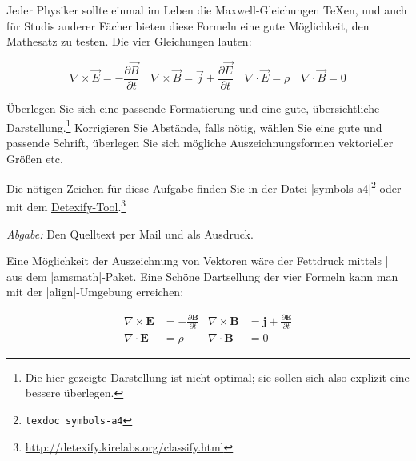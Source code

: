 \documentclass{scrartcl}
\newcommand{\abgabe}[1]{\par\noindent\textit{Abgabe:} #1}
\begin{document}
\begin{question}[subtitle=Maxwell-Gleichungen]{6}
	Jeder Physiker sollte einmal im Leben die Maxwell-Gleichungen \TeX{}en, und auch für Studis anderer Fächer bieten diese Formeln eine gute Möglichkeit, den Mathesatz zu testen. Die vier Gleichungen lauten:

	\[\textstyle \nabla \times \vec E = -\frac{\partial \vec B}{\partial t}\quad \nabla \times \vec B = \vec j + \frac{\partial \vec E}{\partial t}\quad \nabla \cdot \vec E = \rho\quad 
	\nabla \cdot \vec B = 0\]
	
	\noindent Überlegen Sie sich eine passende Formatierung und eine gute, übersichtliche Darstellung.\footnote{Die hier gezeigte Darstellung ist nicht optimal; sie sollen sich also explizit eine bessere überlegen.} Korrigieren Sie Abstände, falls nötig, wählen Sie eine gute und passende Schrift, überlegen Sie sich mögliche Auszeichnungsformen vektorieller Größen etc.
	
	Die nötigen Zeichen für diese Aufgabe finden Sie in der Datei |symbols-a4|\footnote{\texttt{texdoc symbols-a4}} oder mit dem \href{http://detexify.kirelabs.org/classify.html}{Detexify-Tool}.\footnote{\url{http://detexify.kirelabs.org/classify.html}}
	
	\abgabe{Den Quelltext per Mail und als Ausdruck.}
\end{question}

\newsavebox{\SolutionCodeA}
\begin{lrbox}{\SolutionCodeA}
\begin{minipage}{\textwidth}
Eine Möglichkeit der Auszeichnung von Vektoren wäre der Fettdruck mittels |\pmb| aus dem |amsmath|-Paket. Eine Schöne Dartsellung der vier Formeln kann man mit der |align|-Umgebung erreichen:
\begin{LTXexample}
\begin{align*}
  \nabla \times \pmb E &= -\frac{\partial \pmb B}{\partial t} &
  \nabla \times \pmb B &= \pmb j + \frac{\partial \pmb E}{\partial t}\\
  \nabla \cdot \pmb E &= \rho &
  \nabla \cdot \pmb B &= 0
\end{align*}
\end{LTXexample}
\end{minipage}
\end{lrbox}

\begin{solution}
\noindent\usebox\SolutionCodeA
\end{solution}
\end{document}
